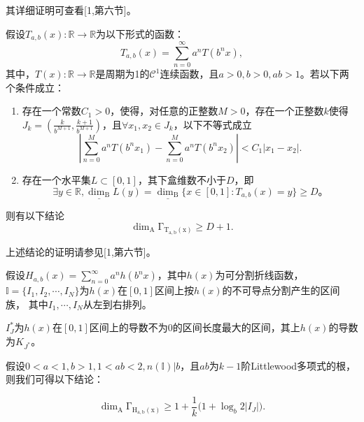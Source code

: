 其详细证明可查看[1,第六节]。

\begin{lemma}
      假设$T_{a,b}(x):\mathbb{R}\rightarrow\mathbb{R}$为以下形式的函数：
      $$
            T_{a,b}(x)=\sum_{n=0}^\infty a^nT(b^nx),
      $$
      其中，$T(x):\mathbb{R}\rightarrow\mathbb{R}$是周期为1的$\mathcal{C}^1$连续函数，且$a>0,b>0,ab>1$。若以下两个条件成立：
      \begin{enumerate}
          \item 存在一个常数$C_1>0$，使得，对任意的正整数$M>0$，存在一个正整数$k$使得$J_k=(\frac{k}{b^{M+1}},\frac{k+1}{b^{M+1}})$，且$\forall x_1,x_2\in J_k$，以下不等式成立
          $$
                |\sum_{n=0}^Ma^nT(b^nx_1)-\sum_{n=0}^Ma^nT(b^nx_2)|<C_1|x_1-x_2|.
          $$
          \item 存在一个水平集$L\subset[0,1]$，其下盒维数不小于$D$，即
          $$
                \exists y\in\mathbb{R},\underline{\mathrm{\dim_B}}L(y)=\underline{\mathrm{\dim_B}}\{x\in[0,1]:T_{a,b}(x)=y\}\ge D。
          $$
      \end{enumerate}
      则有以下结论
      $$
        \mathrm{\dim_A\Gamma_{T_{a,b}(x)}}\ge D+1.
      $$
\end{lemma}

上述结论的证明请参见[1,第六节]。

假设$H_{a,b}(x)=\sum_{n=0}^\infty a^nh(b^nx)$，其中$h(x)$为可分割折线函数，
$\mathbb{I}=\{I_1,I_2,\cdots,I_N\}$为$h(x)$在$[0,1]$区间上按$h(x)$的不可导点分割产生的区间族，
其中$I_1,\cdots,I_N$从左到右排列。

$I_J^*$为$h(x)$在$[0,1]$区间上的导数不为$0$的区间长度最大的区间，其上$h(x)$的导数为$K_{J^*}$。

假设$0<a<1,b>1,1<ab<2,n(\mathbb{I})|b$，且$ab$为$k-1$阶Littlewood多项式的根，则我们可得以下结论：

$$
      \mathrm{\dim_A\Gamma_{H_{a,b}(x)}}\ge1+\frac{1}{k}\Big(1+\log_b2|I_J|\Big).
$$

